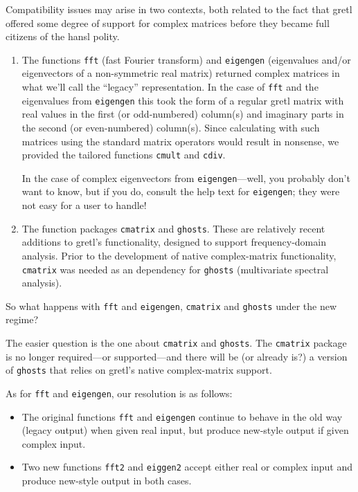 \documentclass{article}
\begin{document}
Compatibility issues may arise in two contexts, both related to the
fact that gretl offered some degree of support for complex matrices
before they became full citizens of the hansl polity.

\begin{enumerate}
\item The functions \texttt{fft} (fast Fourier transform) and
  \texttt{eigengen} (eigenvalues and/or eigenvectors of a
  non-symmetric real matrix) returned complex matrices in what we'll
  call the ``legacy'' representation. In the case of \texttt{fft} and
  the eigenvalues from \texttt{eigengen} this took the form of a
  regular gretl matrix with real values in the first (or odd-numbered)
  column(s) and imaginary parts in the second (or even-numbered)
  column(s). Since calculating with such matrices using the standard
  matrix operators would result in nonsense, we provided the tailored
  functions \texttt{cmult} and \texttt{cdiv}.

  In the case of complex eigenvectors from \texttt{eigengen}---well,
  you probably don't want to know, but if you do, consult the help text
  for \texttt{eigengen}; they were not easy for a user to handle!
\item The function packages \texttt{cmatrix} and
  \texttt{ghosts}. These are relatively recent additions to gretl's
  functionality, designed to support frequency-domain analysis. Prior
  to the development of native complex-matrix functionality,
  \texttt{cmatrix} was needed as an dependency for \texttt{ghosts}
  (multivariate spectral analysis).
\end{enumerate}

So what happens with \texttt{fft} and \texttt{eigengen},
\texttt{cmatrix} and \texttt{ghosts} under the new regime?

The easier question is the one about \texttt{cmatrix} and
\texttt{ghosts}. The \texttt{cmatrix} package is no longer
required---or supported---and there will be (or already is?) a version
of \texttt{ghosts} that relies on gretl's native complex-matrix
support.

As for \texttt{fft} and \texttt{eigengen}, our resolution is
as follows:
\begin{itemize}
\item The original functions \texttt{fft} and \texttt{eigengen}
  continue to behave in the old way (legacy output) when given real
  input, but produce new-style output if given complex input.
\item Two new functions \texttt{fft2} and \texttt{eiggen2} accept
  either real or complex input and produce new-style output in
  both cases.
\end{itemize}
\end{document}
